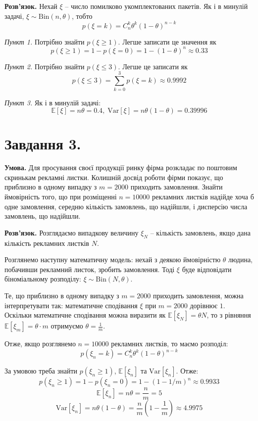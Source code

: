 \documentclass[14pt]{extarticle}
\begin{document}
\textbf{Розв'язок.} Нехай $\xi$ -- число помилково укомплектованих пакетів. Як і в минулій задачі, $\xi \sim \text{Bin}(n,\theta)$, тобто
\[
p(\xi = k) = C_n^k\theta^k(1-\theta)^{n-k}
\]

\textit{Пункт 1.} Потрібно знайти $p(\xi \geq 1)$. Легше записати це значення як
\[
p(\xi \geq 1) = 1 - p(\xi=0) = 1 - (1-\theta)^n \approx 0.33
\]

\textit{Пункт 2.} Потрібно знайти $p(\xi \leq 3)$. Легше це записати як
\[
p(\xi \leq 3) = \sum_{k=0}^3 p(\xi=k) \approx 0.9992
\]

\textit{Пункт 3.} Як і в минулій задачі:
\[
\mathbb{E}[\xi] = n\theta = 0.4, \; \text{Var}[\xi] = n\theta(1-\theta) = 0.39996
\]

\section*{Завдання 3.}
\textbf{Умова.} Для просування своєї продукції ринку фірма розкладає по поштовим скринькам рекламні листки. Колишній досвід роботи фірми показує, що приблизно в одному випадку з $m=2000$ приходить замовлення. Знайти ймовірність того, що при розміщенні $n=10000$ рекламних листків надійде хоча б одне замовлення, середню кількість замовлень, що надійшли, і дисперсію числа замовлень, що надійшли.

\textbf{Розв'язок.} Розглядаємо випадкову величину $\xi_N$ -- кількість замовлень, якщо дана кількість рекламних листків $N$. 

Розглянемо наступну математичну модель: нехай з деякою ймовірністю $\theta$ людина, побачивши рекламний листок, зробить замовлення. Тоді $\xi$ буде відповідати біноміальному розподілу: $\xi \sim \text{Bin}(N,\theta)$. 

Те, що приблизно в одному випадку з $m=2000$ приходить замовлення, можна інтерпретувати так: математичне сподівання $\xi$ при $m=2000$ дорівнює $1$. Оскільки математичне сподівання можна виразити як $\mathbb{E}[\xi_N] = \theta N$, то з рівняння $\mathbb{E}[\xi_{m}] = \theta \cdot m$ отримуємо $\theta = \frac{1}{m}$. 

Отже, якщо розглянемо $n=10000$ рекламних листків, то маємо розподіл:
\[
p(\xi_n = k) = C_n^k\theta^k(1-\theta)^{n-k}
\]

За умовою треба знайти $p(\xi_n \geq 1)$, $\mathbb{E}[\xi_n]$ та $\text{Var}[\xi_n]$. Отже:
\[
p(\xi_n \geq 1) = 1 - p(\xi_n = 0) = 1 - (1-1/m)^{n} \approx 0.9933
\]
\[
\mathbb{E}[\xi_n] = n\theta = \frac{n}{m} = 5
\]
\[
\text{Var}[\xi_n] = n\theta(1-\theta) = \frac{n}{m}\left(1 - \frac{1}{m}\right) \approx 4.9975
\]
\end{document}
